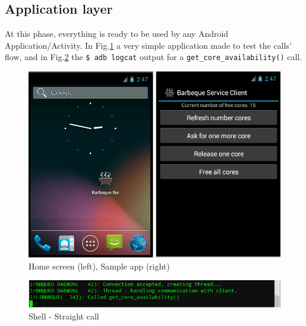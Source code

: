 \subsection{Application layer}
\label{appLayer}
At this phase, everything is ready to be used by any Android Application/Activity. In Fig.\ref{fig:screenshot} a very simple application made to test the calls' flow, and in Fig.\ref{fig:shell} the \texttt{\$ adb logcat} output for a \texttt{get\_core\_availability()} call.
\begin{figure}[!htb]
	\centering
	\includegraphics[scale=.505]{images/screenshot_duo.png}
	\caption{Home screen (left), Sample app (right)}
	\label{fig:screenshot}
\end{figure}
\begin{figure}[!htb]
	\centering
	\includegraphics[scale=.505]{images/shell.png}
	\caption{Shell - Straight call}
	\label{fig:shell}
\end{figure}
